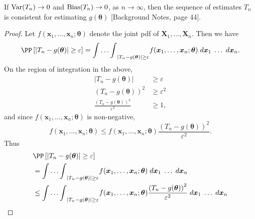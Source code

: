 \begin{thm} \label{thm: var_bias_consistent}
    If ${\operatorname{Var}} (T_n) \to 0$ and ${\operatorname{Bias}} (T_n) \to 0$, as $n \to \infty$, then the sequence of estimates $T_n$ is consistent for estimating $g(\bm{\theta})$ [Background Notes, page 44].
\end{thm}

\begin{proof}
    Let $f(\bm{x}_1 , \ldots , \bm{x}_n ; \bm{\theta})$ denote the joint pdf of $\bm{X}_1 , \ldots , \bm{X}_n$. Then we have
    \begin{equation*}
        \PP \left[ \left| T_n - g (\bm{\theta}) \right| \geq \varepsilon \right] = {\int \ldots \int}_{\left| T_n - g (\bm{\theta}) \right| \geq \varepsilon} f(\bm{x}_1 , \ldots , \bm{x}_n ; \bm{\theta}) \; d \bm{x}_1 \; \ldots \; d \bm{x}_n.
    \end{equation*}
    On the region of integration in the above,
    \begin{align*}
        \left| T_n - g (\bm{\theta}) \right|                         & \geq \varepsilon   \\
        \left( T_n - g (\bm{\theta}) \right)^2                       & \geq \varepsilon^2 \\
        \frac{\left( T_n - g (\bm{\theta}) \right)^2}{\varepsilon^2} & \geq 1,
    \end{align*}
    and since $f(\bm{x}_1 , \ldots , \bm{x}_n ; \bm{\theta})$ is non-negative,
    \begin{equation*}
        f(\bm{x}_1 , \ldots , \bm{x}_n ; \bm{\theta}) \leq f(\bm{x}_1 , \ldots , \bm{x}_n ; \bm{\theta}) \frac{\left( T_n - g (\bm{\theta}) \right)^2}{\varepsilon^2}.
    \end{equation*}
    Thus
    \begin{align*}
         & \PP \left[ \left| T_n - g (\bm{\theta}) \right| \geq \varepsilon \right]                                                                                                                                                         \\
         & = {\int \ldots \int}_{\left| T_n - g (\bm{\theta}) \right| \geq \varepsilon} f(\bm{x}_1 , \ldots , \bm{x}_n ; \bm{\theta}) \; d \bm{x}_1 \; \ldots \; d \bm{x}_n                                                                 \\
         & \leq {\int \ldots \int}_{\left| T_n - g (\bm{\theta}) \right| \geq \varepsilon} f(\bm{x}_1 , \ldots , \bm{x}_n ; \bm{\theta}) \frac{\left( T_n - g (\bm{\theta}) \right)^2}{\varepsilon^2} \; d \bm{x}_1 \; \ldots \; d \bm{x}_n \\

\end{align*}
\end{proof}
